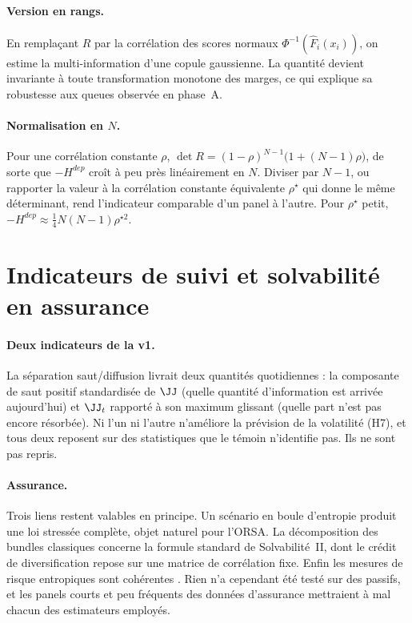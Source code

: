 \paragraph{Version en rangs.} En remplaçant $R$ par la corrélation des scores
normaux $\Phi^{-1}(\hat F_i(x_i))$, on estime la multi-information d'une copule
gaussienne. La quantité devient invariante à toute transformation monotone des
marges, ce qui explique sa robustesse aux queues observée en phase~A.

\paragraph{Normalisation en $N$.} Pour une corrélation constante $\rho$,
$\det R=(1-\rho)^{N-1}\big(1+(N-1)\rho\big)$, de sorte que $-H^{dep}$ croît à peu
près linéairement en $N$. Diviser par $N-1$, ou rapporter la valeur à la
corrélation constante équivalente $\rho^\star$ qui donne le même déterminant,
rend l'indicateur comparable d'un panel à l'autre. Pour $\rho^\star$ petit,
$-H^{dep}\approx\tfrac14N(N-1)\rho^{\star2}$.

\section{Indicateurs de suivi et solvabilité en assurance}
\label{sec:monitoring}

\paragraph{Deux indicateurs de la v1.} La séparation saut/diffusion livrait deux
quantités quotidiennes : la composante de saut positif standardisée de $\JJ$
(quelle quantité d'information est arrivée aujourd'hui) et $\JJ_t$ rapporté à
son maximum glissant (quelle part n'est pas encore résorbée). Ni l'un ni l'autre
n'améliore la prévision de la volatilité (H7), et tous deux reposent sur des
statistiques que le témoin n'identifie pas. Ils ne sont pas repris.

\paragraph{Assurance.} Trois liens restent valables en principe. Un scénario en
boule d'entropie produit une loi stressée complète, objet naturel pour l'ORSA.
La décomposition des bundles classiques concerne la formule standard de
Solvabilité~II, dont le crédit de diversification repose sur une matrice de
corrélation fixe. Enfin les mesures de risque entropiques sont cohérentes
\citep{ahmadijavid2012,artzner1999}. Rien n'a cependant été testé sur des
passifs, et les panels courts et peu fréquents des données d'assurance mettraient
à mal chacun des estimateurs employés.

